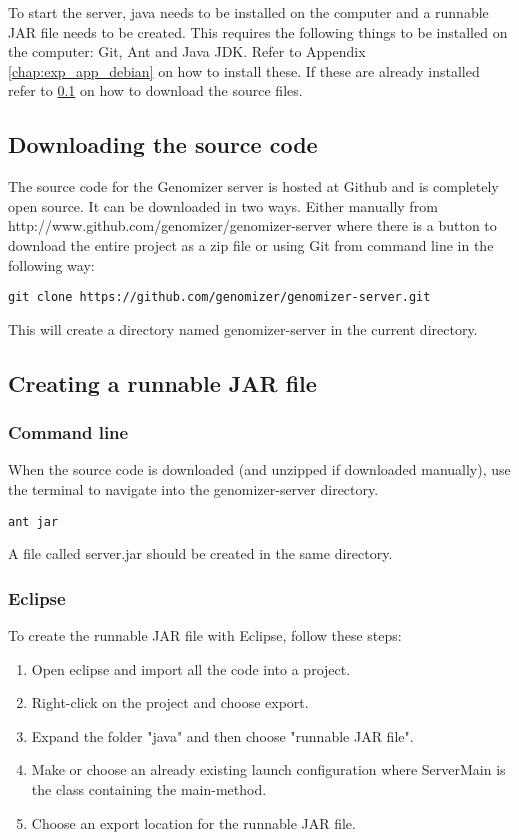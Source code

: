 To start the server, java needs to be installed on the computer and a runnable JAR file needs to be created.
This requires the following things to be installed on the computer: Git, Ant and Java JDK. 
Refer to Appendix \ref{chap:exp_app_debian} on how to install these.
If these are already installed refer to \ref{sec:com_download} on how to download the source files.
\subsection{Downloading the source code}
\label{sec:com_download}
The source code for the Genomizer server is hosted at Github and is completely open source. It can be downloaded in
two ways. Either manually from http://www.github.com/genomizer/genomizer-server where there is a button to
download the entire project as a zip file or using Git from command line in the following way:
\begin{verbatim}
git clone https://github.com/genomizer/genomizer-server.git
\end{verbatim}
This will create a directory named genomizer-server in the current directory.
\subsection{Creating a runnable JAR file}
\label{sec:com_makejar}
\subsubsection{Command line}
When the source code is downloaded (and unzipped if downloaded manually), use the terminal to navigate into
the genomizer-server directory.
\begin{verbatim}
ant jar
\end{verbatim}
A file called server.jar should be created in the same directory.
\subsubsection{Eclipse}
\label{sec:com_UsingEclipse}
To create the runnable JAR file with Eclipse, follow these steps:
\begin{enumerate}
\item Open eclipse and import all the code into a project.
\item Right-click on the project and choose export.
\item Expand the folder "java" and then choose "runnable JAR file".
\item Make or choose an already existing launch configuration where ServerMain is the class containing the main-method.
\item Choose an export location for the runnable JAR file.
\end{enumerate}

